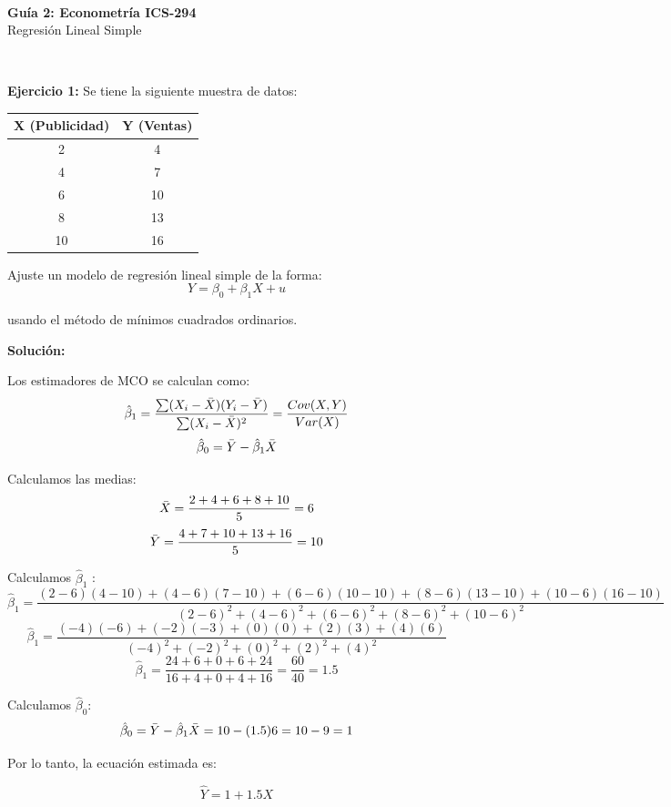 \documentclass[10pt,a4paper]{article}
\begin{document}
\vspace{5cm}

\begin{center}
\begin{Large}
\textbf{\\Guía 2: Econometría ICS-294}\\
\vspace{0.5cm}
{Regresión Lineal Simple}
\end{Large}\\
\end{center}



\textbf{Ejercicio 1:} Se tiene la siguiente muestra de datos:
\begin{center}
\begin{tabular}{|c|c|}
\hline
X (Publicidad) & Y (Ventas) \\
\hline
2 & 4 \\
\hline
4 & 7 \\
\hline
6 & 10 \\
\hline
8 & 13 \\
\hline
10 & 16 \\
\hline
\end{tabular}
\end{center}

Ajuste un modelo de regresión lineal simple de la forma:
$$Y = \beta_0 + \beta_1 X + u $$

usando el método de mínimos cuadrados ordinarios.

{\color{red} \textbf{Solución:}

Los estimadores de MCO se calculan como:
$$\hat{\beta}_1 = \frac{\sum (X_i - \Bar{X})(Y_i - \Bar{Y})}{\sum (X_i - \Bar{X})^2} = \frac{Cov(X,Y)}{Var(X)} $$
$$\hat{\beta}_0  = \Bar{Y} - \hat{\beta}_1 \Bar{X}$$

Calculamos las medias:
$$\Bar{X} = \frac{2+4+6+8+10}{5}=6$$ 
$$\Bar{Y} = \frac{4+7+10+13+16}{5} = 10$$

Calculamos $\hat{\beta}_1$ :
$$\hat{\beta}_1 = \frac{(2-6)(4-10)+(4-6)(7-10)+(6-6)(10-10)+(8-6)(13-10) + (10-6)(16-10)}{(2-6)^2+(4-6)^2+(6-6)^2+(8-6)^2+(10-6)^2}$$
$$\hat{\beta}_1 = \frac{(-4)(-6)+(-2)(-3)+(0)(0)+(2)(3)+(4)(6)}{(-4)^2+(-2)^2+(0)^2+(2)^2+(4)^2}$$
$$\hat{\beta}_1 = \frac{24+6+0+6+24}{16+4+0+4+16}= \frac{60}{40} = 1.5$$

Calculamos $\hat{\beta}_0$:
$$\hat{\beta}_0 = \Bar{Y} - \hat{\beta}_1 \Bar{X} = 10-(1.5)6 = 10 -9 = 1$$

Por lo tanto, la ecuación estimada es:

$$\hat{Y} = 1+1.5X$$}
\end{document}

